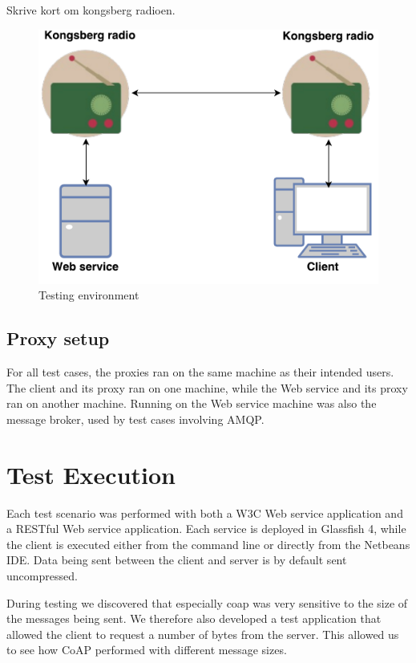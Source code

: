 Skrive kort om kongsberg radioen.

\begin{figure}[h]
\centering
\includegraphics[scale=0.6]{images/radio_testing_environment.pdf}
\caption{Testing environment}
\label{figure-radio-testing-environment}
\end{figure}

\subsection{Proxy setup}

For all test cases, the proxies ran on the same machine as their intended users.
The client and its proxy ran on one machine, while the Web service and its proxy
ran on another machine. Running on the Web service machine was also the message
broker, used by test cases involving AMQP.

\section{Test Execution}

 Each test scenario was performed with both a W3C Web service application and a
 RESTful Web service application. Each service is deployed in Glassfish 4, while
 the client is executed either from the command line or directly from the
 Netbeans IDE. Data being sent between the client and server is by default sent
 uncompressed.

During testing we discovered that especially \gls{coap} was very sensitive to
the size of the messages being sent. We therefore also developed a test
application that allowed the client to request a number of bytes from the
server. This allowed us to see how CoAP performed with different message sizes.

